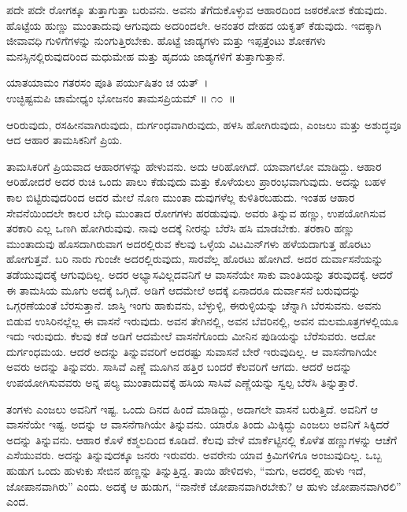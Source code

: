 ಪದೇ ಪದೇ ರೋಗಕ್ಕೂ ತುತ್ತಾಗುತ್ತಾ ಬರುವನು. ಅವನು ತೆಗೆದುಕೊಳ್ಳುವ ಆಹಾರದಿಂದ ಜಠರಕೋಶ ಕೆಡುವುದು. ಹೊಟ್ಟೆಯ ಹುಣ್ಣು ಮುಂತಾದುವು ಆಗುವುದು ಅದರಿಂದಲೇ. ಅನಂತರ ದೇಹದ ಯಕೃತ್  ಕೆಡುವುದು. ಇದಕ್ಕಾಗಿ ಜೀವಾವಧಿ ಗುಳಿಗೆಗಳನ್ನು ನುಂಗುತ್ತಿರಬೇಕು. ಹೊಟ್ಟೆ ಜಾಡ್ಯಗಳು ಮತ್ತು ಇಪ್ಪತ್ತೆಂಟು ಶೋಕಗಳು ಮನಸ್ಸಿನಲ್ಲಿರುವುದರಿಂದ ಮಧುಮೇಹ  ಮತ್ತು ಹೃದಯ ಜಾಡ್ಯಗಳಿಗೆ ತುತ್ತಾಗುತ್ತಾನೆ.

\begin{shloka}
ಯಾತಯಾಮಂ ಗತರಸಂ ಪೂತಿ ಪರ್ಯುಷಿತಂ ಚ ಯತ್~।\\ಉಚ್ಛಿಷ್ಟಮಪಿ ಚಾಮೇಧ್ಯಂ ಭೋಜನಂ ತಾಮಸಪ್ರಿಯಮ್ \hfill॥ ೧೦~॥
\end{shloka}

\begin{artha}
ಆರಿರುವುದು, ರಸಹೀನವಾಗಿರುವುದು, ದುರ್ಗಂಧವಾಗಿರುವುದು, ಹಳಸಿ ಹೋಗಿರುವುದು, ಎಂಜಲು ಮತ್ತು ಅಶುದ್ಧವೂ ಆದ ಆಹಾರ ತಾಮಸಿಕನಿಗೆ ಪ್ರಿಯ.
\end{artha}

ತಾಮಸಿಕರಿಗೆ ಪ್ರಿಯವಾದ ಆಹಾರಗಳನ್ನು ಹೇಳುವನು. ಅದು ಆರಿಹೋಗಿದೆ. ಯಾವಾ\-ಗಲೋ ಮಾಡಿದ್ದು. ಆಹಾರ ಆರಿಹೋದರೆ ಅದರ ರುಚಿ ಒಂದು ಪಾಲು ಕೆಡುವುದು ಮತ್ತು ಕೊಳೆಯಲು ಪ್ರಾರಂಭವಾಗುವುದು. ಅದನ್ನು ಬಹಳ ಕಾಲ ಬಿಟ್ಟಿರುವುದರಿಂದ ಅದರ ಮೇಲೆ ನೊಣ ಮುಂತಾ ದುವುಗಳೆಲ್ಲ ಕುಳಿತಿರಬಹುದು. ಇಂತಹ ಆಹಾರ ಸೇವನೆಯಿಂದಲೇ ಕಾಲರ ಬೇಧಿ ಮುಂತಾದ ರೋಗಗಳು ಹರಡುವುವು. ಅವರು ತಿನ್ನುವ ಹಣ್ಣು, ಉಪಯೋಗಿಸುವ ತರಕಾರಿ ಎಲ್ಲ ಒಣಗಿ ಹೋಗಿರುವುವು. ನಾವು ಅದಕ್ಕೆ ನೀರನ್ನು ಬೆರೆಸಿ ಹಸಿ ಮಾಡಬೇಕು. ತರಕಾರಿ ಹಣ್ಣು ಮುಂತಾದುವು ಹೊಸದಾಗಿರುವಾಗ ಅದರಲ್ಲಿರುವ ಕೆಲವು ಒಳ್ಳೆಯ ವಿಟ\-ಮಿನ್​ಗಳು ಹಳೆಯದಾಗುತ್ತ ಹೊರಟು ಹೋಗುತ್ತವೆ. ಬರಿ ನಾರು ಗುಂಜೇ ಅದರಲ್ಲಿರುವುದು, ಸಾರವೆಲ್ಲ ಹೊರಟು ಹೋಗಿದೆ. ಅದರ ದುರ್ವಾಸನೆಯನ್ನು ತಡೆಯುವುದಕ್ಕೆ ಆಗುವುದಿಲ್ಲ. ಅದರ ಅಭ್ಯಾಸವಿಲ್ಲದವನಿಗೆ ಆ ವಾಸನೆಯೇ ಸಾಕು ವಾಂತಿಯನ್ನು ತರುವುದಕ್ಕೆ. ಆದರೆ ಈ ತಾಮಸಿಯ ಮೂಗು ಅದಕ್ಕೆ ಒಗ್ಗಿದೆ. ಅಡಿಗೆ ಆದಮೇಲೆ ಅದಕ್ಕೆ ಏನಾದರೂ ದುರ್ವಾಸನೆ ಬರುವುದನ್ನು ಒಗ್ಗರಣೆಯಂತೆ ಬೆರಸುತ್ತಾನೆ. ಜಾಸ್ತಿ ಇಂಗು ಹಾಕುವನು, ಬೆಳ್ಳುಳ್ಳಿ, ಈರುಳ್ಳಿಯನ್ನು ಚೆನ್ನಾಗಿ ಬೆರಸುವನು. ಅವನು ಬಿಡುವ ಉಸಿರಿನಲ್ಲೆಲ್ಲ ಈ ವಾಸನೆ ಇರುವುದು. ಅವನ ತೇಗಿನಲ್ಲಿ, ಅವನ ಬೆವರಿನಲ್ಲಿ, ಅವನ ಮಲಮೂತ್ರಗಳಲ್ಲಿಯೂ ಇದು ಇರುವುದು. ಕೆಲವು ಕಡೆ ಅಡಿಗೆ ಆದಮೇಲೆ ವಾಸನೆಗೊಂದು ಮೀನಿನ ಪುಡಿಯನ್ನು ಬೆರೆಸುವರು. ಅದೋ ದುರ್ಗಂಧಮಯ. ಆದರೆ ಅದನ್ನು ತಿನ್ನುವವರಿಗೆ ಅದರಷ್ಟು ಸುವಾಸನೆ ಬೇರೆ ಇರುವುದಿಲ್ಲ. ಆ ವಾಸನೆಗಾಗಿಯೇ ಅವರು ಅದನ್ನು ತಿನ್ನುವರು. ಸಾಸಿವೆ ಎಣ್ಣೆ ಮೂಗಿನ ಹತ್ತಿರ ಬಂದರೆ ಕೆಲವರಿಗೆ ಆಗದು. ಆದರೆ ಅದನ್ನು ಉಪಯೋಗಿಸುವವರು ಅನ್ನ ಪಲ್ಯ ಮುಂತಾದುವಕ್ಕೆ ಹಸಿಯ ಸಾಸಿವೆ ಎಣ್ಣೆಯನ್ನು ಸ್ವಲ್ಪ ಬೆರೆಸಿ ತಿನ್ನುತ್ತಾರೆ.

ತಂಗಳು ಎಂಜಲು ಅವನಿಗೆ ಇಷ್ಟ. ಒಂದು ದಿನದ ಹಿಂದೆ ಮಾಡಿದ್ದು, ಅದಾಗಲೇ ವಾಸನೆ ಬರುತ್ತಿದೆ. ಅವನಿಗೆ ಆ ವಾಸನೆಯೇ ಇಷ್ಟ. ಅದನ್ನು ಆ ವಾಸನೆಗಾಗಿಯೇ ತಿನ್ನುವನು. ಯಾರೊ ತಿಂದು ಮಿಕ್ಕಿದ್ದು ಎಂಜಲು ಅವನಿಗೆ ಸಿಕ್ಕಿದರೆ ಅದನ್ನು ತಿನ್ನುವನು. ಆಹಾರ ಕೊಳೆ ಕಶ್ಮಲದಿಂದ ಕೂಡಿದೆ. ಕೆಲವು ವೇಳೆ ಮಾರ್ಕೆಟ್ಟಿನಲ್ಲಿ ಕೊಳೆತ ಹಣ್ಣುಗಳನ್ನು ಆಚೆಗೆ ಎಸೆಯುವರು. ಅದನ್ನು ತಿನ್ನುವುದಕ್ಕೂ ಜನರು ಇರುವರು. ಅವರೇನು ಯಾವ ಕ್ರಿಮಿಗಳಿಗೂ ಅಂಜುವುದಿಲ್ಲ. ಒಬ್ಬ ಹುಡುಗ ಒಂದು ಹುಳುಕು ಸೇಬಿನ ಹಣ್ಣನ್ನು ತಿನ್ನುತ್ತಿದ್ದ. ತಾಯಿ ಹೇಳಿದಳು, “ಮಗು, ಅದರಲ್ಲಿ ಹುಳು ಇದೆ, ಜೋಪಾನವಾಗಿರು” ಎಂದು. ಅದಕ್ಕೆ ಆ ಹುಡುಗ, “ನಾನೇಕೆ ಜೋಪಾನವಾಗಿರಬೇಕು? ಆ ಹುಳು ಜೋಪಾನವಾಗಿರಲಿ” ಎಂದ.

